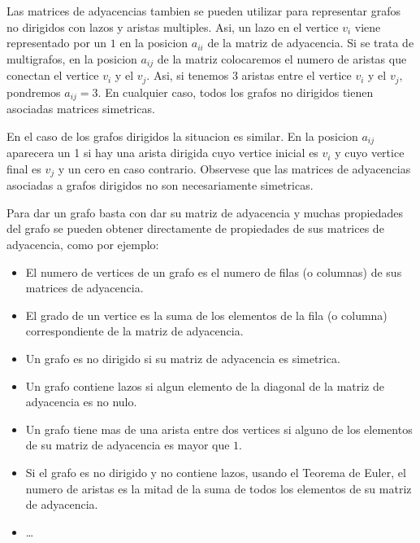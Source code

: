 \begin{remark}
	Las matrices de adyacencias tambien se pueden utilizar para representar grafos no dirigidos con lazos y aristas multiples. Asi, un lazo en el vertice \(v_i \) viene representado por un \(1 \) en la posicion \(a_{ii}\) de la matriz de adyacencia. Si se trata de multigrafos, en la posicion \(a_{ij }\) de la matriz colocaremos el numero de aristas que conectan el vertice \(v_i \) y el \(v_j \). Asi, si tenemos 3 aristas entre el vertice \(v_i \) y el \(v_j ,\) pondremos \(a_{ij} = 3 \). En cualquier caso, todos los grafos no dirigidos tienen asociadas matrices simetricas.
\end{remark}

\begin{remark}
	En el caso de los grafos dirigidos la situacion es similar. En la posicion \(a_{ij }\) aparecera un 1 si hay una arista dirigida cuyo vertice inicial es \(v_i \) y cuyo vertice final es \(v_j \) y un cero en caso contrario. Observese que las matrices de adyacencias asociadas a grafos dirigidos no son necesariamente simetricas.
\end{remark}

Para dar un grafo basta con dar su matriz de adyacencia y muchas propiedades del grafo se pueden obtener directamente de propiedades de sus matrices de adyacencia, como por ejemplo:
\begin{itemize}
	\item El numero de vertices de un grafo es el numero de filas (o columnas) de sus matrices de adyacencia.
	\item El grado de un vertice es la suma de los elementos de la fila (o columna) correspondiente de la matriz de adyacencia.
	\item Un grafo es no dirigido si su matriz de adyacencia es simetrica.
	\item Un grafo contiene lazos si algun elemento de la diagonal de la matriz de adyacencia es no nulo.
	\item Un grafo tiene mas de una arista entre dos vertices si alguno de los elementos de su matriz de adyacencia es mayor que \(1 \).
	\item Si el grafo es no dirigido y no contiene lazos, usando el Teorema de Euler, el numero de aristas es la mitad de la suma de todos los elementos de su matriz de adyacencia.
	\item \dots
\end{itemize}

\vspace{0.3cm}
